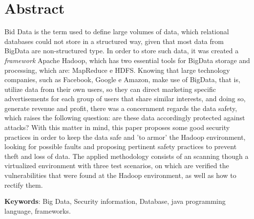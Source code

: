 \chapter*{Abstract}


\noindent Bid Data is the term used to define large volumes of data, which relational databases could not store in a structured way, given that most data from BigData are non-structured type. In order to store such data, it was created a \textit{framework} Apache Hadoop, which has two essential tools for BigData storage and processing, which are: MapReduce e HDFS. Knowing that large technology companies, such as Facebook, Google e Amazon, make use of BigData, that is, utilize data from their own users, so they can direct marketing specific advertisements for each group of users that share similar interests, and doing so, generate revenue and profit, there was a concernment regards the data safety, which raises the following question: are these data accordingly protected against attacks? With this matter in mind, this paper proposes some good security practices in order to keep the data safe and 'to armor' the Hadoop environment, looking for possible faults and proposing pertinent safety practices to prevent theft and loss of data. The applied methodology consists of an scanning though a virtualized environment with three test scenarios, on which are verified the vulnerabilities that were found at the Hadoop environment, as well as how to rectify them.

\vspace{1.5ex}

{\bf Keywords}: Big Data, Security information, Database, java programming language, frameworks.